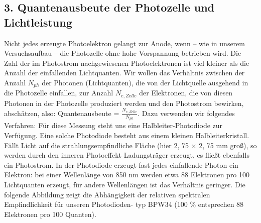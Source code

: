 \documentclass[12px]{scrartcl}
\begin{document}
\subsection{3. Quantenausbeute der Photozelle und Lichtleistung}
Nicht jedes erzeugte Photoelektron gelangt zur Anode, wenn -- wie in unserem Versuchsaufbau -- die
Photozelle ohne hohe Vorspannung betrieben wird. Die Zahl der im Photostrom nachgewiesenen Photoelektronen ist viel kleiner als die Anzahl der einfallenden Lichtquanten. %
Wir wollen das Verhältnis zwischen der Anzahl $N_{ph}$ der Photonen (Lichtquanten), die von der Lichtquelle ausgehend in die Photozelle einfallen, zur
Anzahl $N_{e,Zelle}$ der Elektronen, die von diesen Photonen in der Photozelle produziert werden und den Photostrom bewirken, abschätzen, also: Quantenausbeute = $\frac{N_{e,Zelle}}{N_{ph}}$.
Dazu verwenden wir folgendes Verfahren: Für diese Messung steht uns eine Halbleiter-Photodiode zur Verfügung. Eine solche Photodiode besteht aus einem kleinen Halbleiterkristall. Fällt Licht auf die strahlungsempfindliche Fläche (hier 2, 75 $\times$ 2, 75 mm groß), so werden durch den inneren Photoeffekt Ladungsträger erzeugt, es fließt ebenfalls ein Photostrom. In der Photodiode erzeugt fast jedes einfallende Photon ein Elektron: bei einer Wellenlänge von 850 nm werden
etwa 88 Elektronen pro 100 Lichtquanten erzeugt, für andere Wellenlängen ist das Verhältnis geringer.
Die folgende Abbildung zeigt die Abhängigkeit der relativen spektralen Empfindlichkeit für unseren Photodioden-
typ BPW34 (100 \% entsprechen 88 Elektronen pro 100 Quanten).
\end{document}
